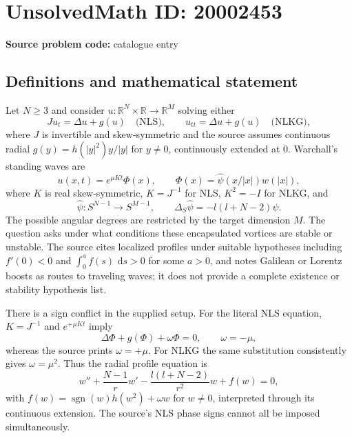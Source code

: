 \documentclass[11pt]{article}
\newcommand{\R}{\mathbb{R}}
\newcommand{\dd}{\,\mathrm{d}}
\begin{document}
\section*{UnsolvedMath ID: 20002453}
\textbf{Source problem code:} catalogue entry
\subsection{Definitions and mathematical statement}
Let $N\ge3$ and consider $u:\R^N\times\R\to\R^M$ solving either
\[
 J u_t=\Delta u+g(u)\quad\text{(NLS)},\qquad
 u_{tt}=\Delta u+g(u)\quad\text{(NLKG)},
\]
where $J$ is invertible and skew-symmetric and the source assumes continuous radial $g(y)=h(|y|^2)y/|y|$ for $y\ne0$, continuously extended at $0$. Warchall's standing waves are
\[
 u(x,t)=e^{\mu Kt}\Phi(x),\qquad
 \Phi(x)=\widehat\psi(x/|x|)w(|x|),
\]
where $K$ is real skew-symmetric, $K=J^{-1}$ for NLS, $K^2=-I$ for NLKG, and
\[
 \widehat\psi:S^{N-1}\to S^{M-1},\qquad
 \Delta_S\widehat\psi=-l(l+N-2)\widehat\psi.
\]
The possible angular degrees are restricted by the target dimension $M$. The question asks under what conditions these encapsulated vortices are stable or unstable. The source cites localized profiles under suitable hypotheses including $f'(0)<0$ and $\int_0^a f(s)\,\dd s>0$ for some $a>0$, and notes Galilean or Lorentz boosts as routes to traveling waves; it does not provide a complete existence or stability hypothesis list.

There is a sign conflict in the supplied setup. For the literal NLS equation, $K=J^{-1}$ and $e^{+\mu Kt}$ imply
\[
 \Delta\Phi+g(\Phi)+\omega\Phi=0,
 \qquad\omega=-\mu,
\]
whereas the source prints $\omega=+\mu$. For NLKG the same substitution consistently gives $\omega=\mu^2$. Thus the radial profile equation is
\[
 w''+\frac{N-1}{r}w'-\frac{l(l+N-2)}{r^2}w+f(w)=0,
\]
with $f(w)=\operatorname{sgn}(w)h(w^2)+\omega w$ for $w\ne0$, interpreted through its continuous extension. The source's NLS phase signs cannot all be imposed simultaneously.
\end{document}

